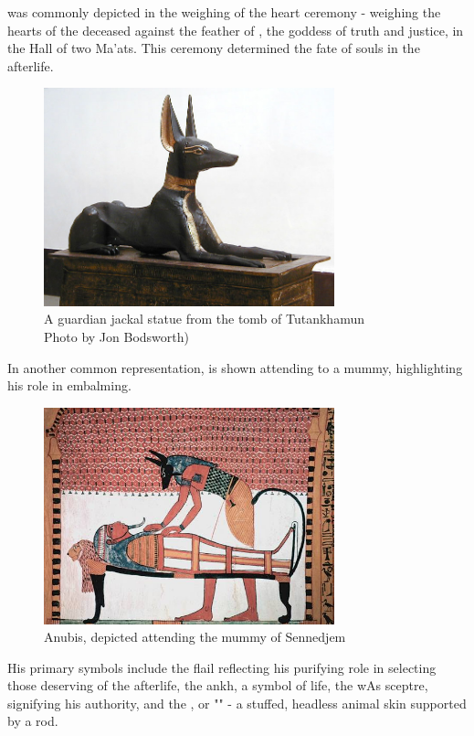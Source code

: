  was commonly depicted in the weighing of the heart ceremony - weighing the hearts of the deceased against the feather of , the goddess of truth and justice, in the Hall of two Ma'ats. This ceremony determined the fate of souls in the afterlife.

\begin{figure} [H]
	\centering
	\includegraphics[width=0.75\textwidth]{../photos/Tutankhamun_Jackal}
	\caption{A guardian jackal statue from the tomb of Tutankhamun\\Photo by Jon Bodsworth)}
\end{figure}

In another common representation,  is shown attending to a mummy, highlighting his role in embalming.

\begin{figure} [H]
	\centering
	\includegraphics[width=0.75\textwidth]{../photos/Anubis_Sennedjem}
	\caption{Anubis, depicted attending the mummy of Sennedjem}
\end{figure}

His primary symbols include the flail reflecting his purifying role in selecting those deserving of the afterlife, the ankh, a symbol of life, the wAs sceptre, signifying his authority, and the , or "" - a stuffed, headless animal skin supported by a rod.

